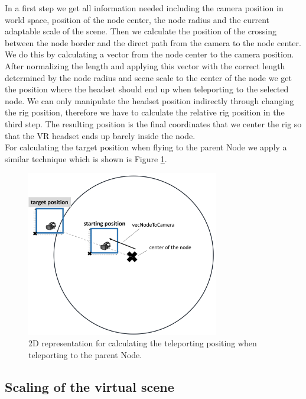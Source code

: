 In a first step we get all information needed including the camera position in world space, position of the node center, the node radius and the current adaptable scale of the scene.
Then we calculate the position of the crossing between the node border and the direct path from the camera to the node center. We do this by calculating a vector from the node center to the camera position. After normalizing the length and applying this vector with the correct length determined by the node radius and scene scale to the center of the node we get the position where the headset should end up when teleporting to the selected node.
We can only manipulate the headset position indirectly through changing the rig position, therefore we have to calculate the relative rig position in the third step. 
The resulting position is the final coordinates that we center the rig so that the VR headset ends up barely inside the node.\\
For calculating the target position when flying to the parent Node we apply a similar technique which is shown is Figure \ref{fig:vrFlyToParentNode}.

\begin{figure}[h]
    \centering
    \includegraphics[width=0.75\textwidth]{graphics/flyToParentNode.jpg}
    \caption{2D representation for calculating the teleporting positing when teleporting to the parent Node.} 
    \label{fig:vrFlyToParentNode} 
\end{figure}

\subsection{Scaling of the virtual scene}
\label{sec:scaling}


